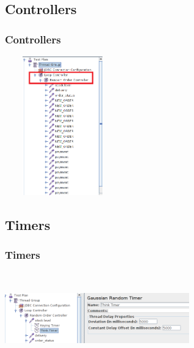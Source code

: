 \documentclass[12pt]{beamer}
\begin{document}
\subsection{Controllers}
\begin{frame}[c]
\frametitle{Controllers}
\centering
   \includegraphics[width=5cm, height=6cm]{images/controller}

\end{frame}

\subsection{Timers}
\begin{frame}[c]
\frametitle{Timers}
\centering
   \includegraphics[width=8cm, height=4cm]{images/timer}

\end{frame}
\end{document}
